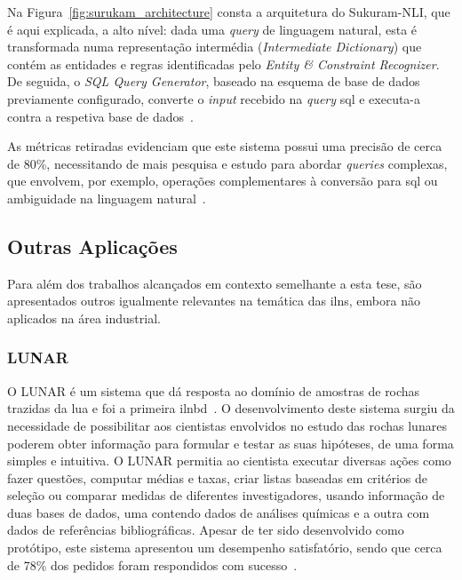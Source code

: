 Na Figura~\ref{fig:surukam_architecture} consta a arquitetura do Sukuram-NLI, que é aqui explicada, a alto nível: dada uma \textit{query} de linguagem natural, esta é transformada numa representação intermédia (\textit{Intermediate Dictionary}) que contém as entidades e regras identificadas pelo \textit{Entity \& Constraint Recognizer}. De seguida, o \textit{SQL Query Generator}, baseado na esquema de base de dados previamente configurado, converte o \textit{input} recebido na \textit{query} \gls{sql} e executa-a contra a respetiva base de dados~\parencite{towards_building_domain_agnostic_nli}.

As métricas retiradas evidenciam que este sistema possui uma precisão de cerca de 80\%, necessitando de mais pesquisa e estudo para abordar \textit{queries} complexas, que envolvem, por exemplo, operações complementares à conversão para \gls{sql} ou ambiguidade na linguagem natural~\parencite{towards_building_domain_agnostic_nli}.

\subsection{Outras Aplicações}
Para além dos trabalhos alcançados em contexto semelhante a esta tese, são apresentados outros igualmente relevantes na temática das \glspl{iln}, embora não aplicados na área industrial.

\subsubsection*{LUNAR}
O LUNAR é um sistema que dá resposta ao domínio de amostras de rochas trazidas da lua e foi a primeira \gls{ilnbd}~\parencite{nlidb_brief_review, survey_nlidb}. O desenvolvimento deste sistema surgiu da necessidade de possibilitar aos cientistas envolvidos no estudo das rochas lunares poderem obter informação para formular e testar as suas hipóteses, de uma forma simples e intuitiva. O LUNAR permitia ao cientista executar diversas ações como fazer questões, computar médias e taxas, criar listas baseadas em critérios de seleção ou comparar medidas de diferentes investigadores, usando informação de duas bases de dados, uma contendo dados de análises químicas e a outra com dados de referências bibliográficas. Apesar de ter sido desenvolvido como protótipo, este sistema apresentou um desempenho satisfatório, sendo que cerca de 78\% dos pedidos foram respondidos com sucesso~\parencite{lunar_sciences_nlis}.

